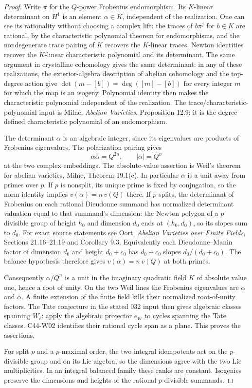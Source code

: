 \documentclass[11pt]{article}
\theoremstyle{remark}\newtheorem{remark}[theorem]{Remark}
\begin{document}
\begin{proof}
Write $\pi$ for the $Q$-power Frobenius endomorphism.  Its
$K$-linear determinant on $H^1$ is an element $\alpha\in K$,
independent of the realization.  One can see its rationality
without choosing a complex lift: the traces of $b\pi^j$ for
$b\in K$ are rational, by the characteristic polynomial theorem
for endomorphisms, and the nondegenerate trace pairing of $K$
recovers the $K$-linear traces.  Newton identities recover the
$K$-linear characteristic polynomial and its determinant.
The same argument in crystalline cohomology gives the same
determinant: in any of these realizations, the exterior-algebra
description of abelian cohomology and the top-degree action give
$\det(m-[b])=\deg([m]-[b])$ for every integer $m$ for which the
map is an isogeny.  Polynomial identity then makes the
characteristic polynomial independent of the realization.
The trace/characteristic-polynomial input is
Milne, \emph{Abelian Varieties}, Proposition 12.9; it is the
degree-defined characteristic polynomial of an endomorphism.

The determinant $\alpha$ is an algebraic integer, since its
eigenvalues are products of Frobenius eigenvalues.  The
polarization pairing gives
\[
 \alpha\bar\alpha=Q^{2n},\qquad |\alpha|=Q^n
\]
at the two complex embeddings.  The absolute-value assertion is
Weil's theorem for abelian varieties, Milne, Theorem 19.1(c).
In particular $\alpha$ is a unit away from primes over $p$.
If $p$ is nonsplit, its unique prime is fixed by conjugation, so
the norm identity implies
$v(\alpha)=n\,v(Q)$ there.  If $p$ splits, the determinant of
Frobenius on each rational Dieudonne summand has normalized
determinant valuation equal to that summand's dimension:
the Newton polygon of a $p$-divisible group of height $h_0$
and dimension $d_0$ ends at $(h_0,d_0)$, so its slopes sum
to $d_0$.  For exact source statements see Oort,
\emph{Abelian Varieties over Finite Fields}, Sections
21.16--21.19 and Corollary 9.3.  Equivalently each
Dieudonne--Manin factor of dimension $d_0$ and height
$d_0+c_0$ has $d_0+c_0$ slopes $d_0/(d_0+c_0)$.
The balance hypothesis therefore gives
$v(\alpha)=n\,v(Q)$ at both primes.

Consequently $\alpha/Q^n$ is a unit in the imaginary quadratic
field $K$ of absolute value one, hence a root of unity.  On the
two Weil lines the Frobenius eigenvalues are $\alpha$ and
$\bar\alpha$.  A finite extension of the finite field kills
their normalized root-of-unity factors.  The Tate conjecture
in the stated 032 input then gives algebraic classes spanning
$W_\ell$: apply the algebraic projector $e_W$ to cycles spanning
the Tate classes.  C44-W02 identifies their rational cycle
span as a plane.  This proves the assertions.

For split $p$ and a $p$-maximal order, the two integral
idempotents act on the $p$-divisible group and on its Lie
algebra, so the dimensions agree with the two Lie
multiplicities.  In an integral balanced family these ranks
are constant.  Isogenies preserve the dimensions and heights
of the rational $p$-divisible summands.
\end{proof}
\end{document}
